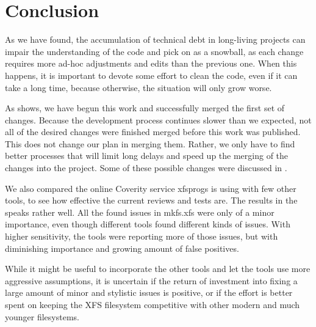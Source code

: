
\chapter{Conclusion} \label{chap:conclusion}

As we have found, the accumulation of technical debt in long-living
projects can impair the understanding of the code and pick on as a
snowball, as each change requires more ad-hoc adjustments and edits than
the previous one. When this happens, it is important to devote some effort
to clean the code, even if it can take a long time, because otherwise, the
situation will only grow worse.

As  shows, we have begun this work and successfully
merged the first set of changes. Because the development process continues
slower than we expected, not all of the desired changes were finished
merged before this work was published. This does not change our plan in
merging them. Rather, we only have to find better processes that will limit
long delays and speed up the merging of the changes into the project. Some
of these possible changes were discussed in
.

We also compared the online Coverity service xfsprogs is using with few
other tools, to see how effective the current reviews and tests are. The
results in the  speaks rather well. All the found issues
in mkfs.xfs were only of a minor importance, even though different tools
found different kinds of issues. With higher sensitivity, the tools were
reporting more of those issues, but with diminishing importance and growing
amount of false positives.

While it might be useful to incorporate the other tools and let the tools
use more aggressive assumptions, it is uncertain if the return of
investment into fixing a large amount of minor and stylistic issues is
positive, or if the effort is better spent on keeping the XFS filesystem
competitive with other modern and much younger filesystems.

